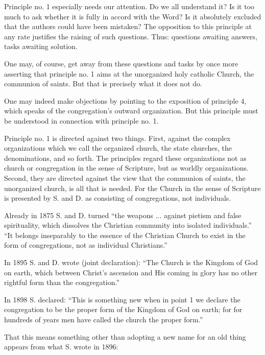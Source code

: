 Principle no. 1 especially needs our attention. Do we all understand it? Is it too much to ask whether it is fully in accord with the Word? Is it absolutely excluded that the authors could have been mistaken? The opposition to this principle at any rate justifies the raising of such questions. Thus: questions awaiting answers, tasks awaiting solution.

One may, of course, get away from these questions and tasks by once more asserting that principle no. 1 aims at the unorganized holy catholic Church, the communion of saints. But that is precisely what it does not do.

One may indeed make objections by pointing to the exposition of principle 4, which speaks of the congregation’s outward organization. But this principle must be understood in connection with principle no. 1.

Principle no. 1 is directed against two things. First, against the complex organizations which we call the organized church, the state churches, the denominations, and so forth. The principles regard these organizations not as church or congregation in the sense of Scripture, but as worldly organizations. Second, they are directed against the view that the communion of saints, the unorganized church, is all that is needed. For the Church in the sense of Scripture is presented by S. and D. as consisting of congregations, not individuals.

Already in 1875 S. and D. turned “the weapons ... against pietism and false spirituality, which dissolves the Christian community into isolated individuals.” “It belongs inseparably to the essence of the Christian Church to exist in the form of congregations, not as individual Christians.”

In 1895 S. and D. wrote (joint declaration): “The Church is the Kingdom of God on earth, which between Christ’s ascension and His coming in glory has no other rightful form than the congregation.”

In 1898 S. declared: “This is something new when in point 1 we declare the congregation to be the proper form of the Kingdom of God on earth; for for hundreds of years men have called the church the proper form.”

That this means something other than adopting a new name for an old thing appears from what S. wrote in 1896:

